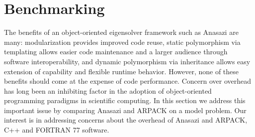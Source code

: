 \documentclass[acmtoms,acmnow]{acmtrans2m}
\newcommand{\aspace}[1]{\texttt{#1}}
\begin{document}



\section{Benchmarking}
\label{sec:benchmarking}

The benefits of an object-oriented eigensolver framework such as Anasazi are many:
modularization provides improved code reuse, static polymorphism via templating allows
easier code maintenance and a larger audience through software interoperability, and
dynamic polymorphism via inheritance allows easy extension of capability and flexible
runtime behavior. However, none of these benefits should come at the expense of code
performance. Concern over overhead has long been an inhibiting factor in the adoption of
object-oriented programming paradigms in scientific computing. In this section we 
address this important issue by comparing Anasazi and ARPACK on a model problem. Our
interest is in addressing concerns about the overhead of Anasazi and ARPACK, C++ and
FORTRAN 77 software.
\end{document}
